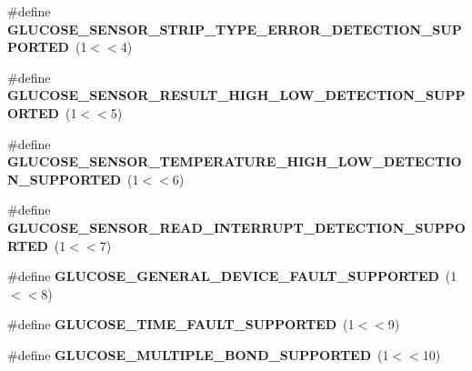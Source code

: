 \begin{DoxyCompactItemize}
\item 
\#define {\bfseries G\+L\+U\+C\+O\+S\+E\+\_\+\+S\+E\+N\+S\+O\+R\+\_\+\+S\+T\+R\+I\+P\+\_\+\+T\+Y\+P\+E\+\_\+\+E\+R\+R\+O\+R\+\_\+\+D\+E\+T\+E\+C\+T\+I\+O\+N\+\_\+\+S\+U\+P\+P\+O\+R\+T\+ED}~(1$<$$<$4)\hypertarget{group___b_l_e___g_s_ga89051b09d9a18101e53abbd363d45579}{}\label{group___b_l_e___g_s_ga89051b09d9a18101e53abbd363d45579}

\item 
\#define {\bfseries G\+L\+U\+C\+O\+S\+E\+\_\+\+S\+E\+N\+S\+O\+R\+\_\+\+R\+E\+S\+U\+L\+T\+\_\+\+H\+I\+G\+H\+\_\+\+L\+O\+W\+\_\+\+D\+E\+T\+E\+C\+T\+I\+O\+N\+\_\+\+S\+U\+P\+P\+O\+R\+T\+ED}~(1$<$$<$5)\hypertarget{group___b_l_e___g_s_gad73762628fef545f04f935ffb4f94c0a}{}\label{group___b_l_e___g_s_gad73762628fef545f04f935ffb4f94c0a}

\item 
\#define {\bfseries G\+L\+U\+C\+O\+S\+E\+\_\+\+S\+E\+N\+S\+O\+R\+\_\+\+T\+E\+M\+P\+E\+R\+A\+T\+U\+R\+E\+\_\+\+H\+I\+G\+H\+\_\+\+L\+O\+W\+\_\+\+D\+E\+T\+E\+C\+T\+I\+O\+N\+\_\+\+S\+U\+P\+P\+O\+R\+T\+ED}~(1$<$$<$6)\hypertarget{group___b_l_e___g_s_ga6a123d5fee7bd69420c1828ceb04732c}{}\label{group___b_l_e___g_s_ga6a123d5fee7bd69420c1828ceb04732c}

\item 
\#define {\bfseries G\+L\+U\+C\+O\+S\+E\+\_\+\+S\+E\+N\+S\+O\+R\+\_\+\+R\+E\+A\+D\+\_\+\+I\+N\+T\+E\+R\+R\+U\+P\+T\+\_\+\+D\+E\+T\+E\+C\+T\+I\+O\+N\+\_\+\+S\+U\+P\+P\+O\+R\+T\+ED}~(1$<$$<$7)\hypertarget{group___b_l_e___g_s_gab1f24ac225f10bdd907bd3b68b92dee3}{}\label{group___b_l_e___g_s_gab1f24ac225f10bdd907bd3b68b92dee3}

\item 
\#define {\bfseries G\+L\+U\+C\+O\+S\+E\+\_\+\+G\+E\+N\+E\+R\+A\+L\+\_\+\+D\+E\+V\+I\+C\+E\+\_\+\+F\+A\+U\+L\+T\+\_\+\+S\+U\+P\+P\+O\+R\+T\+ED}~(1$<$$<$8)\hypertarget{group___b_l_e___g_s_gafc6b85fbb858046ad56fd9fd28f954a9}{}\label{group___b_l_e___g_s_gafc6b85fbb858046ad56fd9fd28f954a9}

\item 
\#define {\bfseries G\+L\+U\+C\+O\+S\+E\+\_\+\+T\+I\+M\+E\+\_\+\+F\+A\+U\+L\+T\+\_\+\+S\+U\+P\+P\+O\+R\+T\+ED}~(1$<$$<$9)\hypertarget{group___b_l_e___g_s_ga50132e303539196e0803e4a92bc0ccd1}{}\label{group___b_l_e___g_s_ga50132e303539196e0803e4a92bc0ccd1}

\item 
\#define {\bfseries G\+L\+U\+C\+O\+S\+E\+\_\+\+M\+U\+L\+T\+I\+P\+L\+E\+\_\+\+B\+O\+N\+D\+\_\+\+S\+U\+P\+P\+O\+R\+T\+ED}~(1$<$$<$10)\hypertarget{group___b_l_e___g_s_ga4ece34a35afa072071a8f8ae771ba76b}{}\label{group___b_l_e___g_s_ga4ece34a35afa072071a8f8ae771ba76b}


\end{DoxyCompactItemize}
